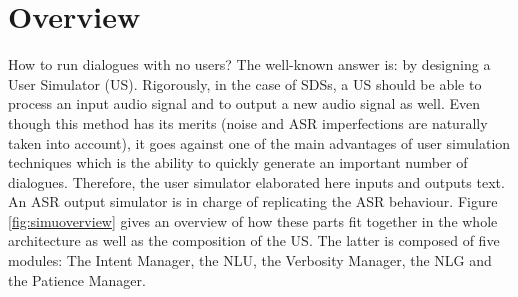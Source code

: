 						
\section{Overview}
	
	How to run dialogues with no users? The well-known answer is: by designing a User Simulator (US). Rigorously, in the case of SDSs, a US should be able to process an input audio signal and to output a new audio signal as well. Even though this method has its merits (noise and ASR imperfections are naturally taken into account), it goes against one of the main advantages of user simulation techniques which is the ability to quickly generate an important number of dialogues. Therefore, the user simulator elaborated here inputs and outputs text. An ASR output simulator is in charge of replicating the ASR behaviour. Figure \ref{fig:simuoverview} gives an overview of how these parts fit together in the whole architecture as well as the composition of the US. The latter is composed of five modules: The Intent Manager, the NLU, the Verbosity Manager, the NLG and the Patience Manager.
	
